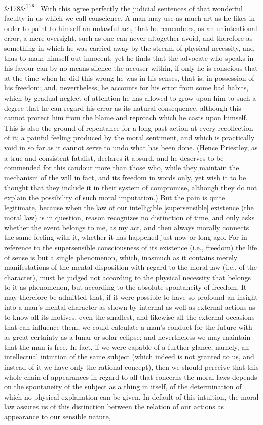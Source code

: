 \documentclass[12pt]{article}
\newcommand{\para}[1][]{\par\noindent\ifx&#1&\else\textsuperscript{\footnotesize #1}~\fi}
\begin{document}
\para[178] With this agree perfectly the judicial sentences of that wonderful faculty in us which we call conscience. A man may use as much art as he likes in order to paint to himself an unlawful act, that he remembers, as an unintentional error, a mere oversight, such as one can never altogether avoid, and therefore as something in which he was carried away by the stream of physical necessity, and thus to make himself out innocent, yet he finds that the advocate who speaks in his favour can by no means silence the accuser within, if only he is conscious that at the time when he did this wrong he was in his senses, that is, in possession of his freedom; and, nevertheless, he accounts for his error from some bad habits, which by gradual neglect of attention he has allowed to grow upon him to such a degree that he can regard his error as its natural consequence, although this cannot protect him from the blame and reproach which he casts upon himself. This is also the ground of repentance for a long past action at every recollection of it; a painful feeling produced by the moral sentiment, and which is practically void in so far as it cannot serve to undo what has been done. (Hence Priestley, as a true and consistent fatalist, declares it absurd, and he deserves to be commended for this candour more than those who, while they maintain the mechanism of the will in fact, and its freedom in words only, yet wish it to be thought that they include it in their system of compromise, although they do not explain the possibility of such moral imputation.) But the pain is quite legitimate, because when the law of our intelligible [supersensible] existence (the moral law) is in question, reason recognizes no distinction of time, and only asks whether the event belongs to me, as my act, and then always morally connects the same feeling with it, whether it has happened just now or long ago. For in reference to the supersensible consciousness of its existence (i.e., freedom) the life of sense is but a single phenomenon, which, inasmuch as it contains merely manifestations of the mental disposition with regard to the moral law (i.e., of the character), must be judged not according to the physical necessity that belongs to it as phenomenon, but according to the absolute spontaneity of freedom. It may therefore be admitted that, if it were possible to have so profound an insight into a man's mental character as shown by internal as well as external actions as to know all its motives, even the smallest, and likewise all the external occasions that can influence them, we could calculate a man's conduct for the future with as great certainty as a lunar or solar eclipse; and nevertheless we may maintain that the man is free. In fact, if we were capable of a further glance, namely, an intellectual intuition of the same subject (which indeed is not granted to us, and instead of it we have only the rational concept), then we should perceive that this whole chain of appearances in regard to all that concerns the moral laws depends on the spontaneity of the subject as a thing in itself, of the determination of which no physical explanation can be given. In default of this intuition, the moral law assures us of this distinction between the relation of our actions as appearance to our sensible nature, 
\end{document}
